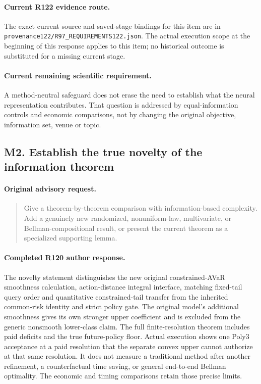 \paragraph{Current R122 evidence route.}
The exact current source and saved-stage bindings for this item are in \nolinkurl{provenance122/R97_REQUIREMENTS122.json}. The actual execution scope at the beginning of this response applies to this item; no historical outcome is substituted for a missing current stage.
\paragraph{Current remaining scientific requirement.}
A method-neutral safeguard does not erase the need to establish what the neural representation contributes. That question is addressed by equal-information controls and economic comparisons, not by changing the original objective, information set, venue or topic.

\subsection{M2. Establish the true novelty of the information theorem}
\label{response122:M2}

\paragraph{Original advisory request.}
\begin{quote}
Give a theorem-by-theorem comparison with information-based complexity. Add a genuinely new randomized, nonuniform-law, multivariate, or Bellman-compositional result, or present the current theorem as a specialized supporting lemma.
\end{quote}

\paragraph{Completed R120 author response.}
The novelty statement distinguishes the new original constrained-AVaR smoothness calculation, action-distance integral interface, matching fixed-tail query order and quantitative constrained-tail transfer from the inherited common-risk identity and strict policy gate. The original model's additional smoothness gives its own stronger upper coefficient and is excluded from the generic nonsmooth lower-class claim. The full finite-resolution theorem includes paid deficits and the true future-policy floor. Actual execution shows one Poly3 acceptance at a paid resolution that the separate convex upper cannot authorize at that same resolution. It does not measure a traditional method after another refinement, a counterfactual time saving, or general end-to-end Bellman optimality. The economic and timing comparisons retain those precise limits.

